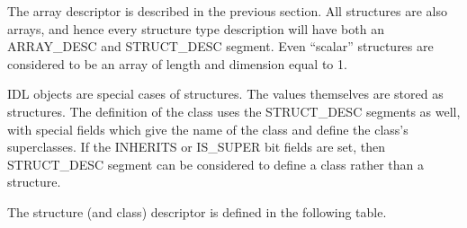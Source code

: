 \documentclass[12pt]{article}
\begin{document}
The array descriptor is described in the previous section.  All
structures are also arrays, and hence every structure type description
will have both an ARRAY\_DESC and STRUCT\_DESC segment.  Even
``scalar'' structures are considered to be an array of length and
dimension equal to 1.  

IDL objects are special cases of structures.  The values themselves
are stored as structures.  The definition of the class uses the
STRUCT\_DESC segments as well, with special fields which give the name
of the class and define the class's superclasses.  If the INHERITS or
IS\_SUPER bit fields are set, then STRUCT\_DESC segment can be
considered to define a class rather than a structure.

The structure (and class) descriptor is defined in the following table.
\end{document}
